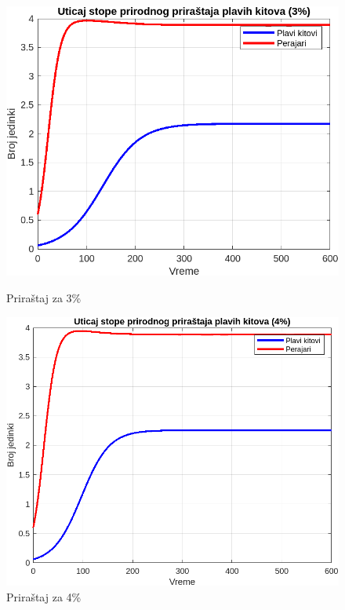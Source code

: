 \documentclass[a4paper]{article}
\begin{document}
{	\begin{figure}[h]
		\centering
		\begin{minipage}[h]{0.45\linewidth}
			\centering
			\includegraphics[width=\textwidth]{uticaj3.png}
			\caption{Priraštaj za 3\%}
			\label{slika1: uticaj3}
		\end{minipage}
		\hspace{0.5cm} 
		\begin{minipage}[h]{0.45\linewidth}
			\centering
			\includegraphics[width=\textwidth]{uticaj4.png} 
			\caption{Priraštaj za 4\%} 
			\label{slika2: uticaj4}
		\end{minipage}
	\end{figure}

}
\end{document}
